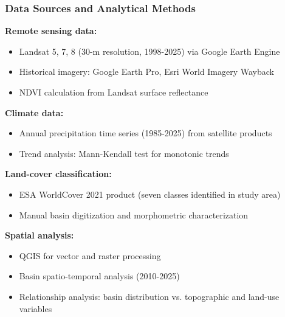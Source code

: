 \documentclass{beamer}
\begin{document}
\begin{frame}
\frametitle{Data Sources and Analytical Methods}

\textbf{Remote sensing data:}
\begin{itemize}
  \item Landsat 5, 7, 8 (30-m resolution, 1998-2025) via Google Earth Engine
  \item Historical imagery: Google Earth Pro, Esri World Imagery Wayback
  \item NDVI calculation from Landsat surface reflectance
\end{itemize}

\vspace{0.2cm}

\textbf{Climate data:}
\begin{itemize}
  \item Annual precipitation time series (1985-2025) from satellite products
  \item Trend analysis: Mann-Kendall test for monotonic trends
\end{itemize}

\vspace{0.2cm}

\textbf{Land-cover classification:}
\begin{itemize}
  \item ESA WorldCover 2021 product (seven classes identified in study area)
  \item Manual basin digitization and morphometric characterization
\end{itemize}

\vspace{0.2cm}

\textbf{Spatial analysis:}
\begin{itemize}
  \item QGIS for vector and raster processing
  \item Basin spatio-temporal analysis (2010-2025)
  \item Relationship analysis: basin distribution vs. topographic and land-use variables
\end{itemize}

\end{frame}

\end{document}
